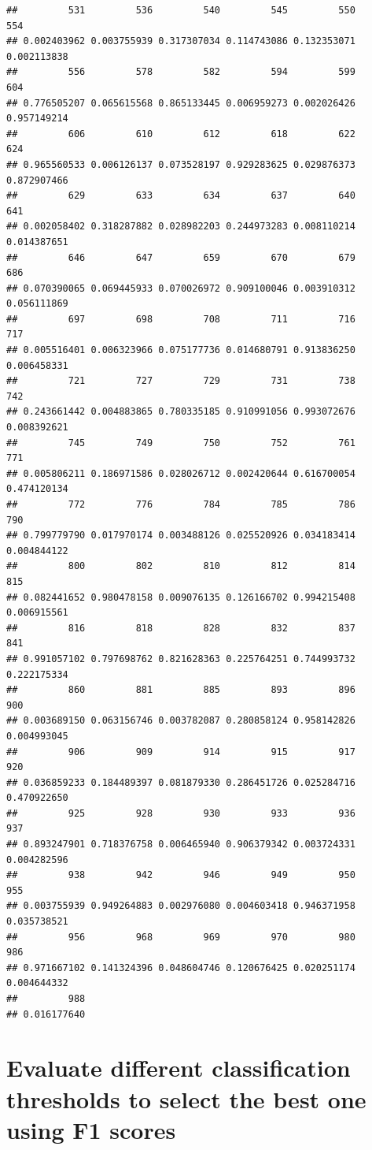 \documentclass[
]{article}
\begin{document}
\begin{verbatim}
##         531         536         540         545         550         554 
## 0.002403962 0.003755939 0.317307034 0.114743086 0.132353071 0.002113838 
##         556         578         582         594         599         604 
## 0.776505207 0.065615568 0.865133445 0.006959273 0.002026426 0.957149214 
##         606         610         612         618         622         624 
## 0.965560533 0.006126137 0.073528197 0.929283625 0.029876373 0.872907466 
##         629         633         634         637         640         641 
## 0.002058402 0.318287882 0.028982203 0.244973283 0.008110214 0.014387651 
##         646         647         659         670         679         686 
## 0.070390065 0.069445933 0.070026972 0.909100046 0.003910312 0.056111869 
##         697         698         708         711         716         717 
## 0.005516401 0.006323966 0.075177736 0.014680791 0.913836250 0.006458331 
##         721         727         729         731         738         742 
## 0.243661442 0.004883865 0.780335185 0.910991056 0.993072676 0.008392621 
##         745         749         750         752         761         771 
## 0.005806211 0.186971586 0.028026712 0.002420644 0.616700054 0.474120134 
##         772         776         784         785         786         790 
## 0.799779790 0.017970174 0.003488126 0.025520926 0.034183414 0.004844122 
##         800         802         810         812         814         815 
## 0.082441652 0.980478158 0.009076135 0.126166702 0.994215408 0.006915561 
##         816         818         828         832         837         841 
## 0.991057102 0.797698762 0.821628363 0.225764251 0.744993732 0.222175334 
##         860         881         885         893         896         900 
## 0.003689150 0.063156746 0.003782087 0.280858124 0.958142826 0.004993045 
##         906         909         914         915         917         920 
## 0.036859233 0.184489397 0.081879330 0.286451726 0.025284716 0.470922650 
##         925         928         930         933         936         937 
## 0.893247901 0.718376758 0.006465940 0.906379342 0.003724331 0.004282596 
##         938         942         946         949         950         955 
## 0.003755939 0.949264883 0.002976080 0.004603418 0.946371958 0.035738521 
##         956         968         969         970         980         986 
## 0.971667102 0.141324396 0.048604746 0.120676425 0.020251174 0.004644332 
##         988 
## 0.016177640
\end{verbatim}

\section{Evaluate different classification thresholds to select the best
one using F1
scores}\label{evaluate-different-classification-thresholds-to-select-the-best-one-using-f1-scores}
\end{document}
